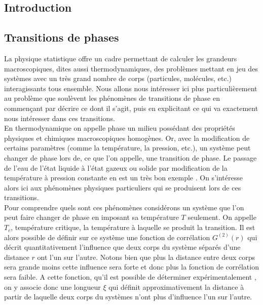 \documentclass[10pt]{article}
\begin{document}

\tableofcontents

\pagebreak
\begin{multicols}{2}

\section{Introduction}

\subsection{Transitions de phases}

La physique statistique  \cite{rohtuA} offre un cadre permettant de calculer les grandeurs macroscopiques, dites aussi thermodynamiques, des problèmes mettant en jeu des systèmes avec un très grand nombre de corps (particules, molécules, etc.) interagissants tous ensemble. Nous allons nous intéresser ici plus particulièrement au problème que soulèvent les phénomènes de transitions de phase en commençant par décrire ce dont il s'agit, puis en explicitant ce qui va exactement nous intéresser dans ces transitions. \\

En thermodynamique on appelle phase un milieu possédant des propriétés physiques et chimiques macroscopiques homogènes. Or, avec la modification de certains paramètres (comme la température, la pression, etc.), un système peut changer de phase lors de, ce que l'on appelle, une transition de phase. Le passage de l'eau de l'état liquide à l'état gazeux ou solide par modification de la température à pression constante en est un très bon exemple \cite{}. On s'intéresse alors ici aux phénomènes physiques particuliers qui se produisent lors de ces transitions. \\

Pour comprendre quels sont ces phénomènes considérons un système que l'on peut faire changer de phase en imposant sa température $T$ seulement. On appelle $T_c$, température critique, la température à laquelle se produit la transition. Il est alors possible de définir sur ce système une fonction de corrélation $G^{(2)}(r)$ qui décrit quantitativement l'influence que deux corps du système séparés d'une distance $r$ ont l'un sur l'autre. Notons bien que plus la distance entre deux corps sera grande moins cette influence sera forte et donc plus la fonction de corrélation sera faible. A cette fonction, qu'il est possible de déterminer expérimentalement \cite{Bellac2012}, on y associe donc une longueur $\xi$ qui définit approximativement la distance à partir de laquelle deux corps du systèmes n'ont plus d'influence l'un sur l'autre.\\


\end{multicols}
\end{document}
